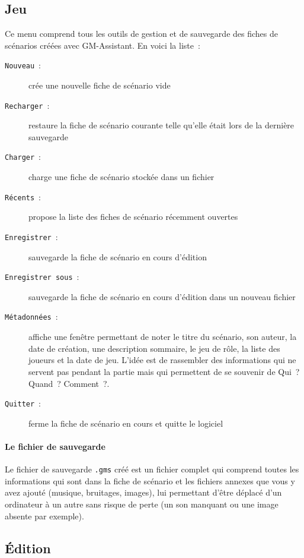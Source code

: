\documentclass[a4paper,12pt]{article}
\newcommand*{\GMA}{GM-Assistant\xspace}
\newcommand*{\interfaceitem}[1]{\texttt{#1}}
\newcommand*{\guillemets}[1]{\og #1\fg{}\xspace}
\begin{document}
\subsection{Jeu}
\label{sec:jeu}

Ce menu comprend tous les outils de gestion et de sauvegarde des fiches de scénarios créées avec \GMA.
En voici la liste~:
\begin{description}
    \item[\interfaceitem{Nouveau}~:]{crée une nouvelle fiche de scénario vide}
    \item[\interfaceitem{Recharger}~:]{restaure la fiche de scénario courante telle qu'elle était lors de la dernière sauvegarde}
    \item[\interfaceitem{Charger}~:]{charge une fiche de scénario stockée dans un fichier}
    \item[\interfaceitem{Récents}~:]{propose la liste des fiches de scénario récemment ouvertes}
    \item[\interfaceitem{Enregistrer}~:]{sauvegarde la fiche de scénario en cours d'édition}
    \item[\interfaceitem{Enregistrer sous}~:]{sauvegarde la fiche de scénario en cours d'édition dans un nouveau fichier}
    \item[\interfaceitem{Métadonnées}~:]{affiche une fenêtre permettant de noter le titre du scénario, son auteur, la date de création, une description sommaire, le jeu de rôle, la liste des joueurs et la date de jeu.
            L'idée est de rassembler des informations qui ne servent pas pendant la partie mais qui permettent de se souvenir de \guillemets{Qui~? Quand~? Comment~?}.}
    \item[\interfaceitem{Quitter}~:]{ferme la fiche de scénario en cours et quitte le logiciel}
\end{description}
\paragraph{Le fichier de sauvegarde}
Le fichier de sauvegarde \texttt{.gms} créé est un fichier complet qui comprend toutes les informations qui sont dans la fiche de scénario et les fichiers annexes que vous y avez ajouté (musique, bruitages, images), lui permettant d'être déplacé d'un ordinateur à un autre sans risque de perte (un son manquant ou une image absente par exemple).

\subsection{Édition}
\label{sec:edition}
\end{document}
